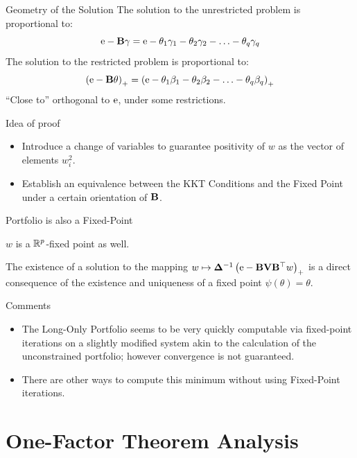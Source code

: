 \documentclass[11pt,leqno]{beamer}
\begin{document}
\begin{frame}{Geometry of the Solution}
The solution to the unrestricted problem is proportional to:
\begin{equation}
\mathrm{e} - \mathbf{B} \gamma = \mathrm{e} - \theta_1 \gamma_1- \theta_2 \gamma_2 - \ldots -\theta_q \gamma_q
\end{equation}
The solution to the restricted problem is proportional to:
\begin{equation}
\left(\mathrm{e} - \mathbf{B} \theta\right)_+ = \left(\mathrm{e} - \theta_1 \beta_1- \theta_2 \beta_2 - \ldots -\theta_q \beta_q\right)_+
\end{equation}
``Close to'' orthogonal to $\mathrm{e}$, under some restrictions.
\end{frame}


\begin{frame}{Idea of proof}
\begin{itemize}
\item  Introduce a change of variables to guarantee positivity of $w$ as the vector of elements $w_i^2$.
\item Establish an equivalence between the KKT Conditions and the Fixed Point under a certain orientation of $\mathbf{B}$.
\end{itemize}

\end{frame}
\begin{frame}{Portfolio is also a Fixed-Point}
\begin{corollary}
$w$ is a $\mathbb{R}^p$-fixed point as well.
\end{corollary}
The existence of a solution to the mapping $w \mapsto \bm{\Delta}^{-1}\left(\mathrm{e} - \mathbf{B} \mathbf{V} \mathbf{B}^\top w\right)_+$ is a direct consequence of the existence and uniqueness of a fixed point $\psi(\theta)=\theta$.
\end{frame}

\begin{frame}{Comments}
\begin{itemize}
\item The Long-Only Portfolio seems to be very quickly computable via fixed-point iterations on a slightly modified system akin to the calculation of the unconstrained portfolio; however convergence is not guaranteed.
\item There are other ways to compute this minimum without using Fixed-Point iterations.
\end{itemize}

\end{frame}

\section{One-Factor Theorem Analysis}
\end{document}
